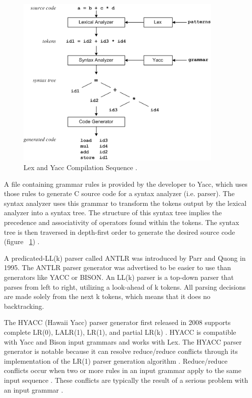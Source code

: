 \begin{figure}[htbp]
\centering
\includegraphics[width=0.9\textwidth]{figures/LexAndYaccCompileSequence.png}
\caption[Lex and Yacc Compilation Sequence]{Lex and Yacc Compilation Sequence \cite{niemann_01}.}
\label{fig:LexAndYaccCompileSequence}
\end{figure}

\indent
A file containing grammar rules is provided by the developer to Yacc, which uses those rules to generate C source code for a syntax analyzer (i.e. parser).  The syntax analyzer uses this grammar to transform the tokens output by the lexical analyzer into a syntax tree.  The structure of this syntax tree implies the precedence and associativity of operators found within the tokens.  The syntax tree is then traversed in depth-first order to generate the desired source code (figure ~\ref{fig:LexAndYaccCompileSequence}) \cite{niemann_01}.

\indent
A predicated-LL(k) parser called ANTLR \cite{parr_01} was introduced by Parr and Quong in 1995.  The ANTLR parser generator was advertised to be easier to use than generators like YACC or BISON.  An LL(k) parser is a top-down parser that parses from left to right, utilizing a look-ahead of k tokens.  All parsing decisions are made solely from the next k tokens, which means that it does no backtracking.

\indent
The HYACC (Hawaii Yacc) parser generator first released in 2008 supports complete LR(0), LALR(1), LR(1), and partial LR(k) \cite{chen_01,chen_02}.  HYACC is compatible with Yacc and Bison input grammars and works with Lex.  The HYACC parser generator is notable because it can resolve reduce/reduce conflicts through its implementation of the LR(1) parser generation algorithm \cite{chen_01}.  Reduce/reduce conflicts occur when two or more rules in an input grammar apply to the same input sequence \cite{free_01}.  These conflicts are typically the result of a serious problem with an input grammar \cite{free_01}.

